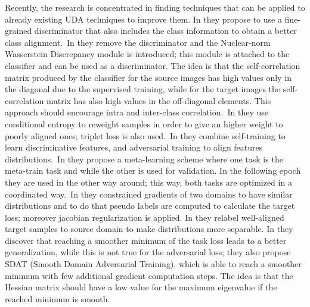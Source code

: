     Recently, the research is concentrated in finding techniques that can be applied to already existing UDA techniques to improve them. 
    In \cite[Wang at al.]{Wang2020} they propose to use a fine-grained discriminator that also includes the class information to obtain a better class alignment.\
    In \cite[Chen at al.]{Chen2022} they remove the discriminator and the Nuclear-norm Wasserstein Discrepancy module  is introduced; this module is attached to the classifier and 
    can be used as a discriminator. The idea is that the self-correlation matrix produced by the classifier for the source images has high values only in the diagonal 
    due to the supervised training, while for the target images the self-correlation matrix has also high values in the off-diagonal elements. This approach should encourage intra and inter-class correlation.\
    In \cite[Wang at al.]{Wang2020} they use conditional entropy to reweight samples in order to give an higher weight to poorly aligned ones;  triplet loss is also used.\
    In \cite[Chen at al.]{Chen2020} they combine self-training  to learn discriminative features, and adversarial training to align features distributions.\
    In \cite[Wei at al.]{Wei2021} they propose a meta-learning scheme where one task is the meta-train task and while the other is used for validation. In the following epoch they 
    are used in the other way around; this way, both tasks are optimized in a coordinated way.\ 
    In \cite[Gao at al.]{Gao2021} they constrained gradients of two domains to have similar distributions and to do that pseudo labels are computed to calculate the target loss;
    moreover jacobian regularization is applied.
    In \cite[Jin at al.]{Jin2021} they relabel well-aligned target samples to source domain to make distributions more separable.
    In \cite[Rangwani at al.]{Rangwani2022} they discover that reaching a  smoother minimum of the task loss leads to a better generalization, while this is not true for the adversarial loss;
    they also propose SDAT (Smooth Domain Adversarial Training),  which is able to reach a smoother minimum with few additional gradient computation steps. The idea is that the Hessian
    matrix should have a low value for the maximum eigenvalue if the reached minimum is smooth.